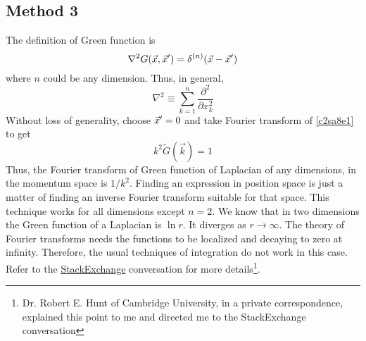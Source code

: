 \subsection{Method 3}\label{c2sa8}
The definition of Green function is
\begin{equation}\label{c2sa8e1}
\nabla^2 G(\vec{x}, \vec{x}^\prime) = \delta^{(n)}(\vec{x} - \vec{x}^\prime)
\end{equation}
where $n$ could be any dimension. Thus, in general,
\[
\nabla^2 \equiv \sum_{k=1}^n \frac{\partial^2}{\partial x_k^2}
\]
Without loss of generality, choose $\vec{x}^\prime = 0$ and take Fourier transform of \eqref{c2sa8e1} to get
\[
k^2\tilde{G}(\vec{k}) = 1
\]
Thus, the Fourier transform of Green function of Laplacian of any dimensions, in the momentum space is $1/k^2$. Finding an expression in position space is just a matter of finding an
inverse Fourier transform suitable for that space. This technique works for all dimensions except $n = 2$. We know that in two dimensions the Green function of a Laplacian is $\ln r$. 
It diverges as $r \rightarrow \infty$. The theory of Fourier transforms needs the functions to be localized and decaying to zero at infinity. Therefore, the usual techniques of 
integration do not work in this case. Refer to the \href{http://math.stackexchange.com/questions/847706/does-the-integral-in-the-formal-2d-fourier-transform-of-the-logarithm-converge}
{StackExchange} conversation for more details{\footnote{Dr. Robert E. Hunt of Cambridge University, in a private correspondence, explained this point to me and directed me to the
StackExchange conversation}}.

